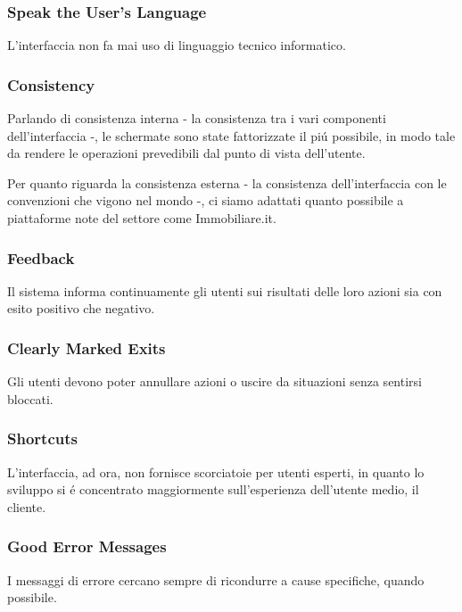 \subsubsection{Speak the User's Language}
L'interfaccia non fa mai uso di linguaggio tecnico informatico.

% 

\subsubsection{Consistency}
Parlando di consistenza interna - la consistenza tra i vari componenti dell'interfaccia -, 
le schermate sono state fattorizzate il piú possibile, in modo tale da
rendere le operazioni prevedibili dal punto di vista dell'utente.

Per quanto riguarda la consistenza esterna - la consistenza dell'interfaccia con
le convenzioni che vigono nel mondo -, ci siamo adattati quanto possibile a piattaforme
note del settore come Immobiliare.it.

\subsubsection{Feedback}
Il sistema informa continuamente gli utenti sui risultati delle loro azioni sia con 
esito positivo che negativo.

\subsubsection{Clearly Marked Exits}
Gli utenti devono poter annullare azioni o uscire da situazioni senza sentirsi bloccati.

\subsubsection{Shortcuts}
L'interfaccia, ad ora, non fornisce scorciatoie per utenti esperti, in quanto
lo sviluppo si é concentrato maggiormente sull'esperienza dell'utente medio, il cliente.

\subsubsection{Good Error Messages}
I messaggi di errore cercano sempre di ricondurre a cause specifiche, quando possibile.

